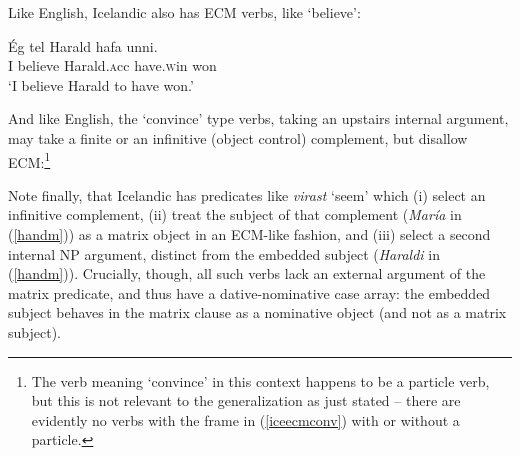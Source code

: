 \documentclass[output=paper]{LSP/langsci}
\begin{document}
Like English, Icelandic also has ECM verbs, like `believe':

\begin{exe}
\ex \gll \'Eg tel Harald hafa unni\dh. \\
I believe Harald.{\textsc acc} have.{\textsc win} won \\
\glt `I believe Harald to have won.' 
\end{exe}

And like English, the `convince' type verbs, taking an upstairs internal argument, may take a finite or an infinitive (object control) complement, but disallow ECM:\footnote{The verb meaning `convince' in this context happens to be a particle verb, but this is not relevant to the generalization as just stated -- there are evidently no verbs with the frame in (\ref{iceecmconv}) with or without a particle.}

\begin{exe}
\ex \begin{xlista}


\end{xlista}
\end{exe}

Note finally, that Icelandic has predicates like \textit{vir{\dh}ast} `seem' which (i) select an infinitive complement, (ii) treat the subject of that complement (\textit{Mar\'ia} in (\ref{handm})) as a matrix object in an ECM-like fashion, and (iii) select a second internal NP argument, distinct from the embedded subject (\textit{Haraldi} in (\ref{handm})). Crucially, though, all such verbs lack an external argument of the matrix predicate, and thus have a dative-nominative case array: the embedded subject behaves in the matrix clause as a nominative object (and not as a matrix subject). 
\end{document}
